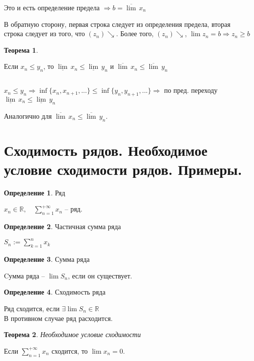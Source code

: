 \documentclass[12pt,letterpaper]{report}
\makeatletter
\newtheorem*{theorem-non}{Теорема}
\theoremstyle{definition}
\newtheorem*{conj}{Определение}
\renewenvironment{proof}[1][\proofname]{%
   \par\pushQED{\qed}\normalfont%
   \topsep6\p@\@plus6\p@\relax
   \trivlist\item[\hskip\labelsep\bfseries#1\@addpunct{.}]%
   \ignorespaces
}{%
   \popQED\endtrivlist\@endpefalse
}
\makeatother
\begin{document}
\begin{proof}
        Это и есть определение предела $\Rightarrow b = 
        \overline{\lim}\, x_n$
    
        В обратную сторону, первая строка следует из определения предела,
        вторая строка следует из того, что $(z_n) \searrow$. Более того,
        $(z_n) \searrow$, $\lim z_n = b \Rightarrow z_n \geq b$
    
    \end{proof}
    
    \begin{theorem-non}\end{theorem-non}
    Если $x_n \leq y_n$, то 
    $\underline{\lim}\, x_n \leq \underline{\lim}\, y_n$ и  
    $\overline{\lim}\, x_n \leq \overline{\lim}\, y_n$
    
    \begin{proof} $ $
    
    $x_n \leq y_n \Rightarrow \inf\{x_n, x_{n + 1}, ...\} \leq
    \inf\{y_n, y_{n + 1}, ...\} \Rightarrow$ по пред. переходу 
    $\underline{\lim}\, x_n \leq \underline{\lim}\, y_n$
    
    Аналогично для $\overline{\lim}\, x_n \leq \overline{\lim}\, y_n$.
    \end{proof}
    
    \section{Сходимость рядов. Необходимое условие сходимости рядов. Примеры.}
    
    \begin{conj}Ряд\end{conj}
    $x_n \in \mathbb{R}, \quad \sum_{n=1}^{+\infty} x_n$ -- ряд.
    
    \begin{conj}Частичная сумма ряда\end{conj}
    $S_n := \sum_{k=1}^{n} x_k$
    
    \begin{conj}Сумма ряда\end{conj}
    Cумма ряда -- $\lim S_n$, если он существует.
    
    \begin{conj}Сходимость ряда\end{conj}
    Ряд сходится, если $\exists \lim S_n \in \mathbb{R}$\\
    В противном случае ряд расходится.
    
    \begin{theorem-non}
    Необходимое условие сходимости
    \end{theorem-non}
    Если $\sum_{n = 1}^{+\infty} x_n$ сходится, то $\lim x_n = 0$.
    
\end{document}
